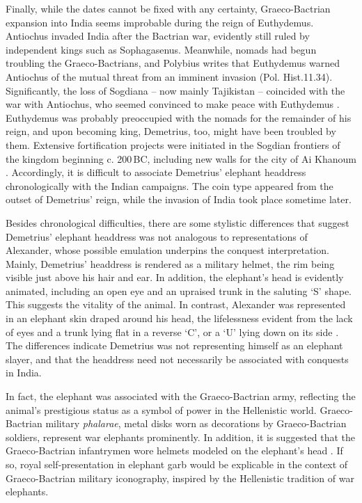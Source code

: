 \documentclass{ijsra}
\renewcommand\BC{{\,BC\xspace}}
\begin{document}
Finally, while the dates cannot be fixed with any certainty, Graeco-Bactrian expansion into India seems improbable during the reign of Euthydemus.
Antiochus invaded India after the Bactrian war, evidently still ruled by independent kings such as Sophagasenus.
Meanwhile, nomads had begun troubling the Graeco-Bactrians, and Polybius writes that Euthydemus warned Antiochus of the mutual threat from an imminent invasion (Pol. Hist.11.34).
Significantly, the loss of Sogdiana – now mainly Tajikistan – coincided with the war with Antiochus, who seemed convinced to make peace with Euthydemus \parencites[38--39]{Holt1981}[135]{Holt1999}.
Euthydemus was probably preoccupied with the nomads for the remainder of his reign, and upon becoming king, Demetrius, too, might have been troubled by them.
Extensive fortification projects were initiated in the Sogdian frontiers of the kingdom beginning c. 200\BC, including new walls for the city of Ai Khanoum \parencites[38--39]{Holt1981}[135]{Holt1999}[60--61]{Lerner1999}[236]{Widemann2000}.
Accordingly, it is difficult to associate Demetrius’ elephant headdress chronologically with the Indian campaigns.
The coin type appeared from the outset of Demetrius’ reign, while the invasion of India took place sometime later.

Besides chronological difficulties, there are some stylistic differences that suggest Demetrius’ elephant headdress was not analogous to representations of Alexander, whose possible emulation underpins the conquest interpretation.
Mainly, Demetrius’ headdress is rendered as a military helmet, the rim being visible just above his hair and ear.
In addition, the elephant’s head is evidently animated, including an open eye and an upraised trunk in the saluting ‘S’ shape.
This suggests the vitality of the animal.
In contrast, Alexander was represented in an elephant skin draped around his head,
the lifelessness evident from the lack of eyes and a trunk lying flat in
a reverse ‘C’, or a ‘U’ lying down on its side \parencites[11]{Dahmen2007}[37]{Marcinkiewicz-Joseph2016}[48]{Maritz2004}[63]{Smith1986}.
The differences indicate Demetrius was not representing himself as an elephant slayer, and that the headdress need not necessarily be associated with conquests in India. 

In fact, the elephant was associated with the Graeco-Bactrian army, reflecting the animal’s prestigious status as a symbol of power in the Hellenistic world.
Graeco-Bactrian military \emph{phalarae}, metal disks worn as decorations by Graeco-Bactrian soldiers, represent war elephants prominently.
In addition, it is suggested that the Graeco-Bactrian infantrymen wore helmets modeled on the elephant’s head \parencites[170]{Abdullaev1995}[1206-1211]{Bannikov2013}[9--10]{Pfrommer1993}[588]{Treister1999}.
If so, royal self-presentation in elephant garb would be explicable in the context of Graeco-Bactrian military iconography, inspired by the Hellenistic tradition of war elephants.
\end{document}
